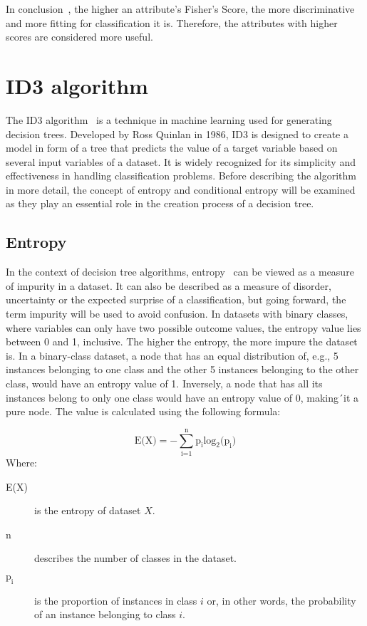 In conclusion~\cite{feature_selection}, the higher an attribute's Fisher's Score, the more discriminative and more fitting for classification it is. Therefore, the attributes with higher scores are considered more useful.

\section{ID3 algorithm} \label{ID3}
The ID3 algorithm~\cite{id3_algorithm_wiki} is a technique in machine learning used for generating decision trees. Developed by Ross Quinlan in 1986, ID3 is designed to create a model in form of a tree that predicts the value of a target variable based on several input variables of a dataset. It is widely recognized for its simplicity and effectiveness in handling classification problems. Before describing the algorithm in more detail, the concept of entropy and conditional entropy will be examined as they play an essential role in the creation process of a decision tree.

\subsection{Entropy} \label{entropy}
In the context of decision tree algorithms, entropy~\cite{entropy_dash} can be viewed as a measure of impurity in a dataset. It can also be described as a measure of disorder, uncertainty or the expected surprise of a classification, but going forward, the term impurity will be used to avoid confusion. In datasets with binary classes, where variables can only have two possible outcome values, the entropy value lies between 0 and 1, inclusive. The higher the entropy, the more impure the dataset is. In a binary-class dataset, a node that has an equal distribution of, e.g., 5 instances belonging to one class and the other 5 instances belonging to the other class, would have an entropy value of 1. Inversely, a node that has all its instances belong to only one class would have an entropy value of 0, making´it a pure node.
The value is calculated using the following formula:

\[ \text{E(X)} = -\sum_\text{i=1}^\text{n} \text{p}_\text{i} {\text{log}_\text{2} \text{(p}_\text{i})} \]
Where:
\begin{description}
	\item[E(X)] is the entropy of dataset $X$.
	\item[n] describes the number of classes in the dataset.
    \item[$\text{p}_\text{i}$] is the proportion of instances in class $i$ or, in other words, the probability of an instance belonging to class $i$.
\end{description}


